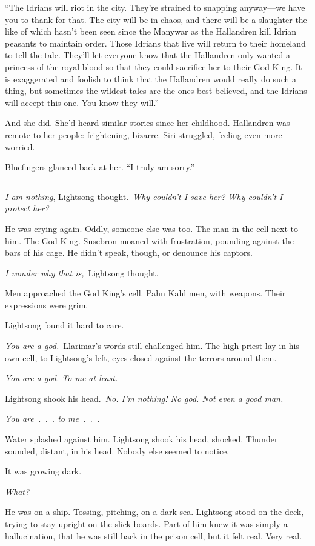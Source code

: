 “The Idrians will riot in the city. They’re strained to snapping anyway—we have you to thank for that. The city will be in chaos, and there will be a slaughter the like of which hasn’t been seen since the Manywar as the Hallandren kill Idrian peasants to maintain order. Those Idrians that live will return to their homeland to tell the tale. They’ll let everyone know that the Hallandren only wanted a princess of the royal blood so that they could sacrifice her to their God King. It is exaggerated and foolish to think that the Hallandren would really do such a thing, but sometimes the wildest tales are the ones best believed, and the Idrians will accept this one. You know they will.”

And she did. She’d heard similar stories since her childhood. Hallandren was remote to her people: frightening, bizarre. Siri struggled, feeling even more worried.

Bluefingers glanced back at her. “I truly am sorry.”

\bigskip \hrule \bigskip

\textit{I am nothing}, Lightsong thought.~\textit{Why couldn’t I save her? Why couldn’t I protect her?}

He was crying again. Oddly, someone else was too. The man in the cell next to him. The God King. Susebron moaned with frustration, pounding against the bars of his cage. He didn’t speak, though, or denounce his captors.

\textit{I wonder why that is,}~Lightsong thought.

Men approached the God King’s cell. Pahn Kahl men, with weapons. Their expressions were grim.

Lightsong found it hard to care.

\textit{You are a god.}~Llarimar’s words still challenged him. The high priest lay in his own cell, to Lightsong’s left, eyes closed against the terrors around them.

\textit{You are a god. To me at least.}

Lightsong shook his head.~\textit{No. I’m nothing! No god. Not even a good man.}

\textit{You are~.~.~. to me~.~.~.}

Water splashed against him. Lightsong shook his head, shocked. Thunder sounded, distant, in his head. Nobody else seemed to notice.

It was growing dark.

\textit{What?}

He was on a ship. Tossing, pitching, on a dark sea. Lightsong stood on the deck, trying to stay upright on the slick boards. Part of him knew it was simply a hallucination, that he was still back in the prison cell, but it felt real. Very real.

